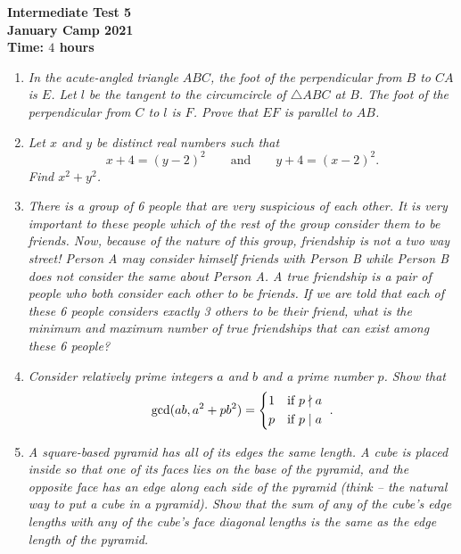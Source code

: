 \documentclass{article}
\begin{document}
\thispagestyle{empty}

\begin{center}
  \textbf{\Large Intermediate Test 5}
  \\ \vspace{1em}
  \textbf{\large January Camp 2021}
  \\ \vspace{1em}
  \textbf{\large Time: $4$ hours}
\end{center}

\vspace{12pt}

\begin{enumerate}[1.]

\item %
{\itshape In the acute-angled triangle $ABC$, the foot of the perpendicular from $B$ to $CA$ is $E$. Let $l$ be the tangent to the circumcircle of $\triangle ABC$ at $B$. The foot of the perpendicular from $C$ to $l$ is $F$. Prove that $EF$ is parallel to $AB$.}


\item %
{\itshape Let $x$ and $y$ be distinct real numbers such that $$x + 4 = (y - 2)^2 \qquad\text{and}\qquad y + 4 = (x - 2)^2.$$
Find $x^2 + y^2$.}


\item %
{\itshape There is a group of 6 people that are very suspicious of each other. It is very important to these people which of the rest of the group consider them to be friends. Now, because of the nature of this group, friendship is not a two way street! Person A may consider himself friends with Person B while Person B does not consider the same about Person A. A true friendship is a pair of people who both consider each other to be friends. If we are told that each of these 6 people considers exactly 3 others to be their friend, what is the minimum and maximum number of true friendships that can exist among these 6 people?}


\item %
{\itshape Consider relatively prime integers $a$ and $b$ and a prime number $p$.
Show that
\[ \gcd(ab, a^2+pb^2) = \begin{cases*} 1 & if $p \nmid a$ \\ p & if $p \mid a$ \end{cases*}. \]}


\item %
{\itshape A square-based pyramid has all of its edges the same length.
A cube is placed inside so that one of its faces lies on the base of the pyramid, and the opposite face has an edge along each side of the pyramid (think -- the natural way to put a cube in a pyramid).
Show that the sum of any of the cube's edge lengths with any of the cube's face diagonal lengths is the same as the edge length of the pyramid.}



\end{enumerate}
\end{document}
